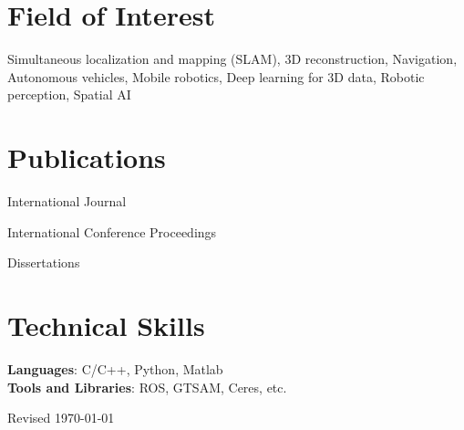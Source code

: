 \documentclass{cv} %
\begin{document}
\vspace{2mm}
\section{Field of Interest}
Simultaneous localization and mapping (SLAM), 3D reconstruction, Navigation, Autonomous vehicles, Mobile robotics, Deep learning for 3D data, Robotic perception, Spatial AI

\section{Publications}

\begin{pubSubsectionNum}{International Journal}
  \item {}
  \item {}
\end{pubSubsectionNum}

\vspace{-2mm}
\begin{pubSubsectionNum}{International Conference Proceedings}
  \item {}
  \item {}
  \item {}
  \item {}
  \item {} %
\end{pubSubsectionNum}

\vspace{-2mm}
\begin{pubSubsectionNum}{Dissertations}
  \item {}
\end{pubSubsectionNum}

\vspace{-3mm}

\section{Technical Skills}
 \begin{itemize}[leftmargin=0.02in, label={}]
    \small{\item{
     \textbf{Languages}{: C/C++, Python, Matlab} \\
     \textbf{Tools and Libraries}{: ROS, GTSAM, Ceres, etc. } \\
    }}
 \end{itemize}





\hfill Revised \today
\end{document}
